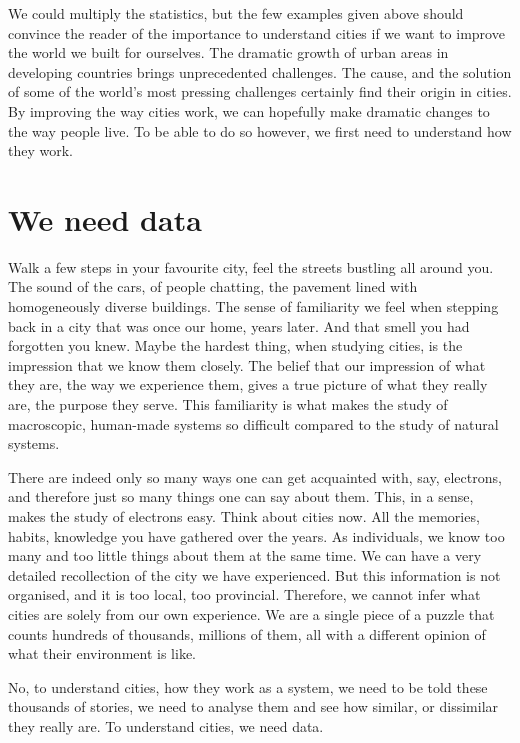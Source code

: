 We could multiply the statistics, but the few examples given above should
convince the reader of the importance to understand cities if we want to
improve the world we built for ourselves. The dramatic growth of urban areas in
developing countries brings unprecedented challenges. The cause, and the
solution of some of the world's most pressing challenges certainly find their origin in
cities. By improving the way cities work, we can hopefully make dramatic changes
to the way people live. To be able to do so however, we first need to understand
how they work.



\section{We need data}
\label{sub:we_need_data}

Walk a few steps in your favourite city, feel the streets bustling all around
you. The sound of the cars, of people chatting, the pavement lined with
 homogeneously diverse buildings. The sense of familiarity we feel when stepping
back in a city that was once our home, years later. And that smell you had
forgotten you knew. Maybe the hardest thing, when studying cities, is the
impression that we know them closely. The belief that our impression of what
they are, the way we experience them, gives a true picture of what they really
are, the purpose they serve. This familiarity is what makes the study of
macroscopic, human-made systems so difficult compared to the study of natural
systems. 

There are indeed only so many ways one can get acquainted with, say, electrons, and
therefore just so many things one can say about them. This, in a sense, makes the
study of electrons easy. Think about cities now. All the memories, habits,
knowledge you have gathered over the years. As individuals, we know too many and
too little things about them at the same time. We can have a very detailed
recollection of the city we have experienced. But this information is not
organised, and it is too local, too provincial. Therefore, we cannot infer what
cities are solely from our own experience.  We are a single piece of a puzzle
that counts hundreds of thousands, millions of them, all with a different
opinion of what their environment is like. 

No, to understand cities, how they work as a system, we need to be told these
thousands of stories, we need to analyse them and see how similar, or dissimilar
they really are. To understand cities, we need data.\\



